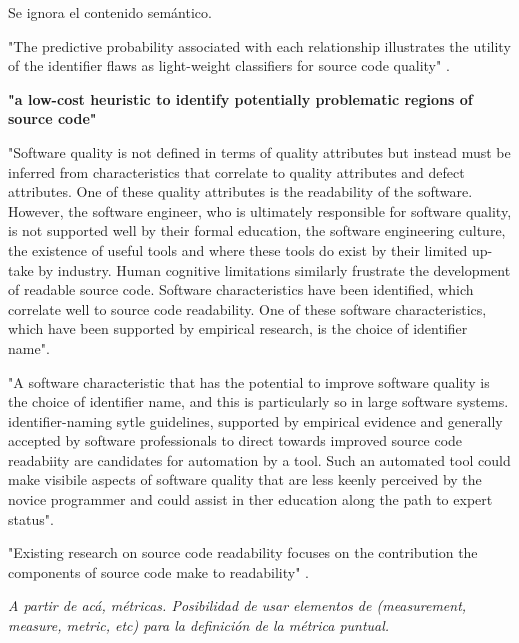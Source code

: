 Se ignora el contenido semántico.

"The predictive probability associated with each relationship illustrates the utility
of the identifier flaws as light-weight classifiers for source code quality"
\cite{ButlerWemelingerYu10}.

\textbf{"a low-cost heuristic to identify potentially problematic regions of source code"}

"Software quality is not defined in terms of quality attributes but instead must be
inferred from characteristics that correlate to quality attributes and defect attributes.
One of these quality attributes is the readability of the software.
However, the software engineer, who is ultimately responsible for software quality,
is not supported well by their formal education, the software engineering culture, the
existence of useful tools and where these tools do exist by their limited up-take by industry.
Human cognitive limitations similarly frustrate the development of readable source code.
Software characteristics have been identified, which correlate well to source code readability.
One of these software characteristics, which have been supported by empirical research,
is the choice of identifier name".\cite{Relf04}

"A software characteristic that has the potential to improve software quality is the choice of
identifier name, and this is particularly so in large software systems.
identifier-naming sytle guidelines, supported by empirical evidence and generally accepted by
software professionals to direct towards improved source code readabiity are candidates for
automation by a tool.
Such an automated tool could make visibile aspects of software quality that are less keenly
perceived by the novice programmer and could assist in ther education along the path to
expert status"\cite{Relf04}.

"Existing research on source code readability focuses on the contribution the
components of source code make to readability" \cite{Buse2008}.

\textit{A partir de acá, métricas.
Posibilidad de usar elementos de (measurement, measure, metric, etc) para la definición de
la métrica puntual.}

